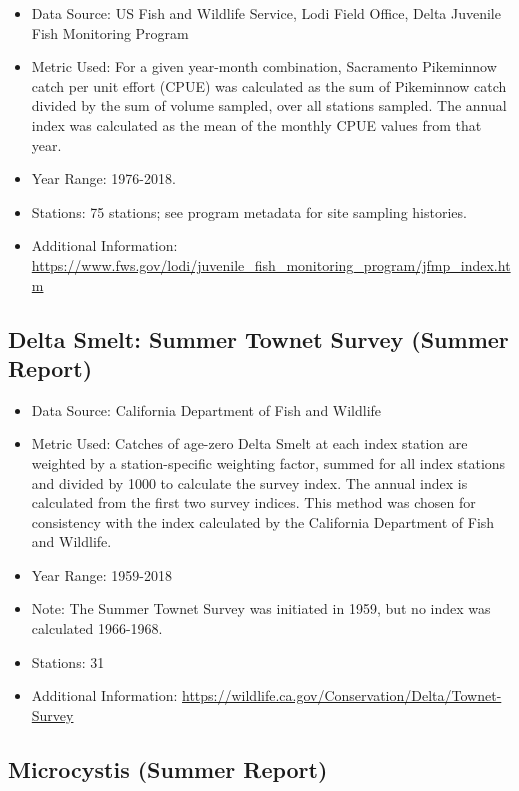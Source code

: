 \documentclass[
]{book}
\providecommand{\tightlist}{%
  \setlength{\itemsep}{0pt}\setlength{\parskip}{0pt}}
\begin{document}
\begin{itemize}
\tightlist
\item
  Data Source: US Fish and Wildlife Service, Lodi Field Office, Delta Juvenile Fish Monitoring Program
\item
  Metric Used: For a given year-month combination, Sacramento Pikeminnow catch per unit effort (CPUE) was calculated as the sum of Pikeminnow catch divided by the sum of volume sampled, over all stations sampled. The annual index was calculated as the mean of the monthly CPUE values from that year.
\item
  Year Range: 1976-2018.
\item
  Stations: 75 stations; see program metadata for site sampling histories.
\item
  Additional Information: \url{https://www.fws.gov/lodi/juvenile_fish_monitoring_program/jfmp_index.htm}
\end{itemize}

\hypertarget{delta-smelt-summer-townet-survey-summer-report}{%
\subsection{Delta Smelt: Summer Townet Survey (Summer Report)}\label{delta-smelt-summer-townet-survey-summer-report}}

\begin{itemize}
\tightlist
\item
  Data Source: California Department of Fish and Wildlife
\item
  Metric Used: Catches of age-zero Delta Smelt at each index station are weighted by a station-specific weighting factor, summed for all index stations and divided by 1000 to calculate the survey index. The annual index is calculated from the first two survey indices. This method was chosen for consistency with the index calculated by the California Department of Fish and Wildlife.
\item
  Year Range: 1959-2018
\item
  Note: The Summer Townet Survey was initiated in 1959, but no index was calculated 1966-1968.
\item
  Stations: 31
\item
  Additional Information: \url{https://wildlife.ca.gov/Conservation/Delta/Townet-Survey}
\end{itemize}

\hypertarget{microcystis-summer-report}{%
\subsection{Microcystis (Summer Report)}\label{microcystis-summer-report}}
\end{document}
